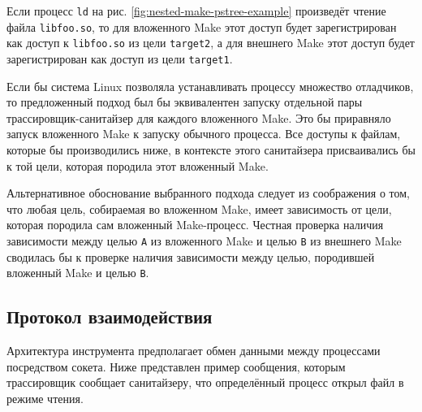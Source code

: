 Если процесс \texttt{ld} на рис. \ref{fig:nested-make-pstree-example} произведёт чтение файла \texttt{libfoo.so}, то для вложенного Make этот доступ будет зарегистрирован как доступ к \texttt{libfoo.so} из цели \texttt{target2}, а для внешнего Make этот доступ будет зарегистрирован как доступ из цели \texttt{target1}.

Если бы система Linux позволяла устанавливать процессу множество отладчиков, то предложенный подход был бы эквивалентен запуску отдельной пары трассировщик-санитайзер для каждого вложенного Make. Это бы приравняло запуск вложенного Make к запуску обычного процесса. Все доступы к файлам, которые бы производились ниже, в контексте этого санитайзера присваивались бы к той цели, которая породила этот вложенный Make.

Альтернативное обоснование выбранного подхода следует из соображения о том, что любая цель, собираемая во вложенном Make, имеет зависимость от цели, которая породила сам вложенный Make-процесс. Честная проверка наличия зависимости между целью \texttt{A} из вложенного Make и целью \texttt{B} из внешнего Make сводилась бы к проверке наличия зависимости между целью, породившей вложенный Make и целью \texttt{B}.

\subsection{Протокол взаимодействия}
\label{subsec:pstree}

Архитектура инструмента предполагает обмен данными между процессами посредством сокета. Ниже представлен пример сообщения, которым трассировщик сообщает санитайзеру, что определённый процесс открыл файл в режиме чтения.

